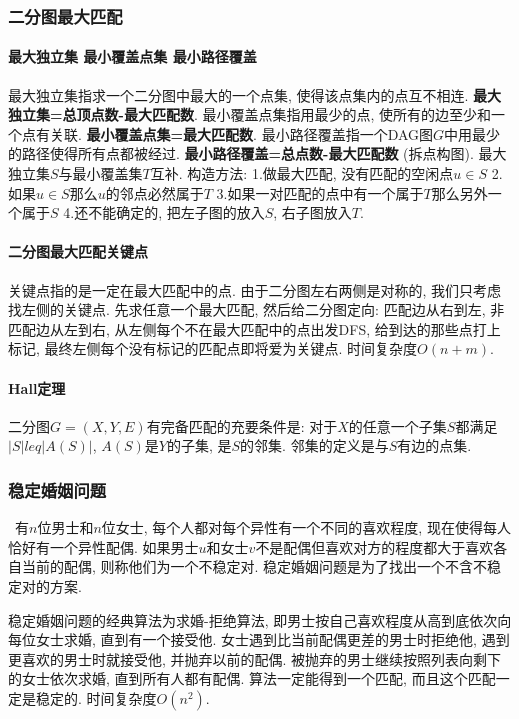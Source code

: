\subsubsection{二分图最大匹配}
        \paragraph{最大独立集 最小覆盖点集 最小路径覆盖} 最大独立集指求一个二分图中最大的一个点集, 使得该点集内的点互不相连. \textbf{最大独立集=总顶点数-最大匹配数}. 最小覆盖点集指用最少的点, 使所有的边至少和一个点有关联. \textbf{最小覆盖点集=最大匹配数}. 最小路径覆盖指一个DAG图$G$中用最少的路径使得所有点都被经过. \textbf{最小路径覆盖=总点数-最大匹配数} (拆点构图). 最大独立集$S$与最小覆盖集$T$互补. 构造方法: 1.做最大匹配, 没有匹配的空闲点$u\in S$ 2.如果$u\in S$那么$u$的邻点必然属于$T$ 3.如果一对匹配的点中有一个属于$T$那么另外一个属于$S$ 4.还不能确定的, 把左子图的放入$S$, 右子图放入$T$.
        \paragraph{二分图最大匹配关键点} 关键点指的是一定在最大匹配中的点. 由于二分图左右两侧是对称的, 我们只考虑找左侧的关键点. 先求任意一个最大匹配, 然后给二分图定向: 匹配边从右到左, 非匹配边从左到右, 从左侧每个不在最大匹配中的点出发DFS, 给到达的那些点打上标记, 最终左侧每个没有标记的匹配点即将爱为关键点. 时间复杂度$O(n+m)$. 
        \paragraph{Hall定理}二分图$G=(X,Y,E)$有完备匹配的充要条件是: 对于$X$的任意一个子集$S$都满足$|S|leq |A(S)|$, $A(S)$是$Y$的子集, 是$S$的邻集. 邻集的定义是与$S$有边的点集. 

\subsubsection{稳定婚姻问题}\
         有$n$位男士和$n$位女士, 每个人都对每个异性有一个不同的喜欢程度, 现在使得每人恰好有一个异性配偶. 如果男士$u$和女士$v$不是配偶但喜欢对方的程度都大于喜欢各自当前的配偶, 则称他们为一个不稳定对. 稳定婚姻问题是为了找出一个不含不稳定对的方案. 
         \par 稳定婚姻问题的经典算法为求婚-拒绝算法, 即男士按自己喜欢程度从高到底依次向每位女士求婚, 直到有一个接受他. 女士遇到比当前配偶更差的男士时拒绝他, 遇到更喜欢的男士时就接受他, 并抛弃以前的配偶. 被抛弃的男士继续按照列表向剩下的女士依次求婚, 直到所有人都有配偶. 算法一定能得到一个匹配, 而且这个匹配一定是稳定的. 时间复杂度$O(n^2)$. 

